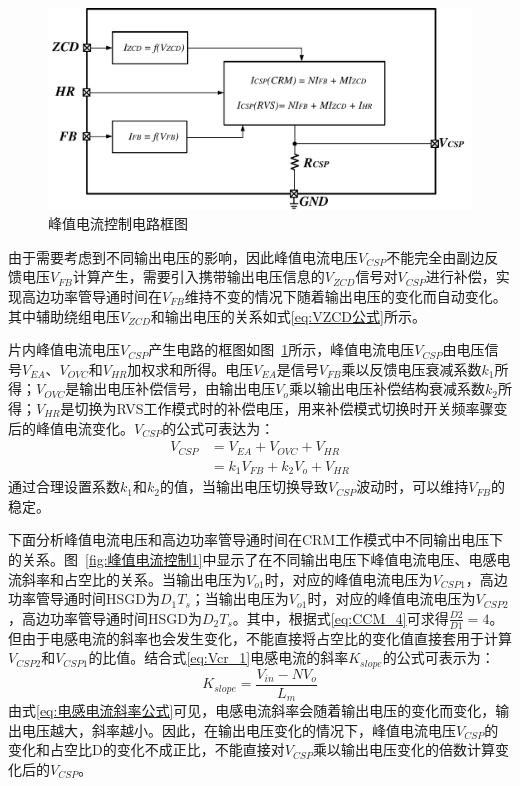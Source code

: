 \begin{figure}[htbp] 
    \centering
    \includegraphics[width=0.8\linewidth]{figures/峰值电流控制.pdf}
    \caption{峰值电流控制电路框图}
    \label{fig:峰值电流控制框图}
\end{figure}

由于需要考虑到不同输出电压的影响，因此峰值电流电压$V_{CSP}$不能完全由副边反馈电压$V_{FB}$计算产生，需要引入携带输出电压信息的$V_{ZCD}$信号对$V_{CSP}$进行补偿，实现高边功率管导通时间在$V_{FB}$维持不变的情况下随着输出电压的变化而自动变化。其中辅助绕组电压$V_{ZCD}$和输出电压的关系如式\eqref{eq:VZCD公式}所示。

片内峰值电流电压$V_{CSP}$产生电路的框图如图~\ref{fig:峰值电流控制框图}所示，峰值电流电压$V_{CSP}$由电压信号$V_{EA}$、$V_{OVC}$和$V_{HR}$加权求和所得。电压$V_{EA}$是信号$V_{FB}$乘以反馈电压衰减系数$k_1$所得；$V_{OVC}$是输出电压补偿信号，由输出电压$V_o$乘以输出电压补偿结构衰减系数$k_2$所得；$V_{HR}$是切换为RVS工作模式时的补偿电压，用来补偿模式切换时开关频率骤变后的峰值电流变化。$V_{CSP}$的公式可表达为：
\begin{align}
    \label{eq:VCSP公式1}
    V_{CSP} &= V_{EA} + V_{OVC} + V_{HR} \\ &= k_1 V_{FB} + k_2 V_o + V_{HR}  
\end{align}
通过合理设置系数$k_1$和$k_2$的值，当输出电压切换导致$V_{CSP}$波动时，可以维持$V_{FB}$的稳定。

下面分析峰值电流电压和高边功率管导通时间在CRM工作模式中不同输出电压下的关系。图~\ref{fig:峰值电流控制1}中显示了在不同输出电压下峰值电流电压、电感电流斜率和占空比的关系。当输出电压为$V_{o1}$时，对应的峰值电流电压为$V_{CSP1}$，高边功率管导通时间HSGD为$D_1T_s$；当输出电压为$V_{o1}$时，对应的峰值电流电压为$V_{CSP2}$，高边功率管导通时间HSGD为$D_2T_s$。其中，根据式\eqref{eq:CCM_4}可求得$\frac{D2}{D1} = 4$。但由于电感电流的斜率也会发生变化，不能直接将占空比的变化值直接套用于计算$V_{CSP2}$和$V_{CSP1}$的比值。结合式\eqref{eq:Vcr_1}电感电流的斜率$K_{slope}$的公式可表示为：
\begin{equation}
    \label{eq:电感电流斜率公式}
    K_{slope} = \frac{V_{in} - N V_o}{L_m}
\end{equation}
由式\eqref{eq:电感电流斜率公式}可见，电感电流斜率会随着输出电压的变化而变化，输出电压越大，斜率越小。因此，在输出电压变化的情况下，峰值电流电压$V_{CSP}$的变化和占空比D的变化不成正比，不能直接对$V_{CSP}$乘以输出电压变化的倍数计算变化后的$V_{CSP}$。

